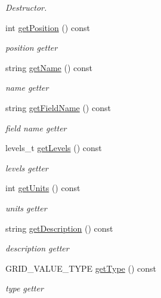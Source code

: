 \begin{DoxyCompactItemize}
\begin{DoxyCompactList}\small\item\em Destructor. \end{DoxyCompactList}\item 
int \hyperlink{classfwi_1_1grid_1_1GridField_a072a0a3d4d33df73481db9c8ba8fd314}{get\-Position} () const 
\begin{DoxyCompactList}\small\item\em position getter \end{DoxyCompactList}\item 
string \hyperlink{classfwi_1_1grid_1_1GridField_a05b8c0003a6becfee51b51a3b4ceefd8}{get\-Name} () const 
\begin{DoxyCompactList}\small\item\em name getter \end{DoxyCompactList}\item 
string \hyperlink{classfwi_1_1grid_1_1GridField_a19a0a30c9fc957e8193e7c653bf9f59c}{get\-Field\-Name} () const 
\begin{DoxyCompactList}\small\item\em field name getter \end{DoxyCompactList}\item 
levels\-\_\-t \hyperlink{classfwi_1_1grid_1_1GridField_ac4d051d3d3bef72fdf61be364154ab32}{get\-Levels} () const 
\begin{DoxyCompactList}\small\item\em levels getter \end{DoxyCompactList}\item 
int \hyperlink{classfwi_1_1grid_1_1GridField_a5f6c5229fecdc6209a0f4243dd587d4a}{get\-Units} () const 
\begin{DoxyCompactList}\small\item\em units getter \end{DoxyCompactList}\item 
string \hyperlink{classfwi_1_1grid_1_1GridField_ac08eb816cc9d30b1c795352a3063852f}{get\-Description} () const 
\begin{DoxyCompactList}\small\item\em description getter \end{DoxyCompactList}\item 
G\-R\-I\-D\-\_\-\-V\-A\-L\-U\-E\-\_\-\-T\-Y\-P\-E \hyperlink{classfwi_1_1grid_1_1GridField_a32c9d7a1a0684af02e1ff14954172540}{get\-Type} () const 
\begin{DoxyCompactList}\small\item\em type getter \end{DoxyCompactList}\item 

\end{DoxyCompactItemize}
